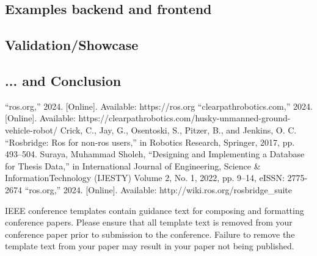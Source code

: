 \documentclass[conference]{IEEEtran}
\begin{document}
\subsection{Examples backend and frontend}

\subsection{Validation/Showcase}



\subsection{... and Conclusion}

\begin{thebibliography}{00}
 “ros.org,”
2024.
[Online].
Available:
https://ros.org
 “clearpathrobotics.com,”
2024.
[Online].
Available:
https://clearpathrobotics.com/husky-unmanned-ground-vehicle-robot/
 Crick, C., Jay, G., Osentoski, S., Pitzer, B., and Jenkins, O. C. ``Rosbridge: Ros
for non-ros users,'' in Robotics Research, Springer, 2017, pp. 493--504.
 Suraya, Muhammad Sholeh, ``Designing and Implementing a Database for Thesis Data,'' in International Journal of Engineering, Science \& InformationTechnology (IJESTY)
Volume 2, No. 1, 2022, pp. 9--14, eISSN: 2775-2674
“ros.org,” 
2024.
[Online]. 
Available:
http://wiki.ros.org/rosbridge\_suite
\end{thebibliography}
\vspace{12pt}
\color{red}
IEEE conference templates contain guidance text for composing and formatting conference papers. Please ensure that all template text is removed from your conference paper prior to submission to the conference. Failure to remove the template text from your paper may result in your paper not being published.
\end{document}
